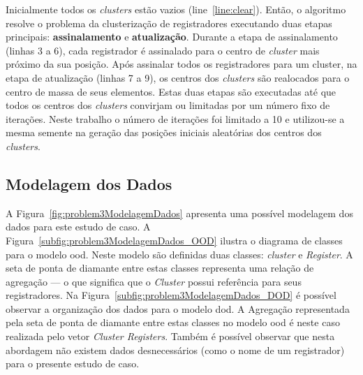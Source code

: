 Inicialmente todos os \textit{clusters} estão vazios (line~\ref{line:clear}).
Então, o algoritmo resolve o problema da clusterização de registradores executando duas etapas principais: \textbf{assinalamento} e \textbf{atualização}.
Durante a etapa de assinalamento (linhas 3 a 6), cada registrador é assinalado para o centro de \textit{cluster} mais próximo da  sua posição.
Após assinalar todos os registradores para um cluster, na etapa de atualização (linhas 7 a 9), os centros dos \textit{clusters} são realocados para o centro de massa de seus elementos.
Estas duas etapas são executadas até que todos os centros dos \textit{clusters} convirjam ou limitadas por um número fixo de iterações.
Neste trabalho o número de iterações foi limitado a 10 e utilizou-se a mesma semente na geração das posições iniciais aleatórias dos centros dos \textit{clusters}.



\subsection{Modelagem dos Dados}
\label{subsec:modelagemDadosProblem3}
A Figura~\ref{fig:problem3ModelagemDados} apresenta uma possível modelagem dos dados para este estudo de caso.
A Figura~\ref{subfig:problem3ModelagemDados_OOD} ilustra o diagrama de classes para o modelo \ac{ood}.
Neste modelo são definidas duas classes: \textit{cluster} e \textit{Register}.
A seta de ponta de diamante entre estas classes representa  uma relação de agregação --- o que significa que o \textit{Cluster} possui referência para seus registradores.
Na Figura~\ref{subfig:problem3ModelagemDados_DOD} é possível observar a organização dos dados para o modelo \ac{dod}.
A Agregação representada pela seta de ponta de diamante entre estas classes no modelo \ac{ood} é neste caso realizada pelo vetor \textit{Cluster Registers}.
Também é possível observar que nesta abordagem não existem dados desnecessários (como o nome de um registrador) para o presente estudo de caso.

